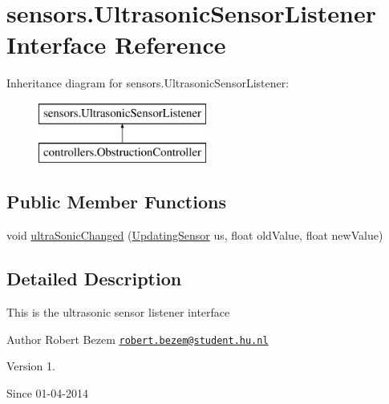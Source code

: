 \hypertarget{interfacesensors_1_1_ultrasonic_sensor_listener}{\section{sensors.\-Ultrasonic\-Sensor\-Listener Interface Reference}
\label{interfacesensors_1_1_ultrasonic_sensor_listener}
}
Inheritance diagram for sensors.\-Ultrasonic\-Sensor\-Listener\-:\begin{figure}[H]
\begin{center}
\leavevmode
\includegraphics[height=2.000000cm]{interfacesensors_1_1_ultrasonic_sensor_listener}
\end{center}
\end{figure}
\subsection*{Public Member Functions}
\begin{DoxyCompactItemize}
\item 
void \hyperlink{interfacesensors_1_1_ultrasonic_sensor_listener_ac66510bffddde1ed90f98b5fe1858f21}{ultra\-Sonic\-Changed} (\hyperlink{interfacesensors_1_1_updating_sensor}{Updating\-Sensor} us, float old\-Value, float new\-Value)
\end{DoxyCompactItemize}


\subsection{Detailed Description}
This is the ultrasonic sensor listener interface

\begin{DoxyAuthor}{Author}
Robert Bezem \href{mailto:robert.bezem@student.hu.nl}{\tt robert.\-bezem@student.\-hu.\-nl} 
\end{DoxyAuthor}
\begin{DoxyVersion}{Version}
1. 
\end{DoxyVersion}
\begin{DoxySince}{Since}
01-\/04-\/2014 
\end{DoxySince}


